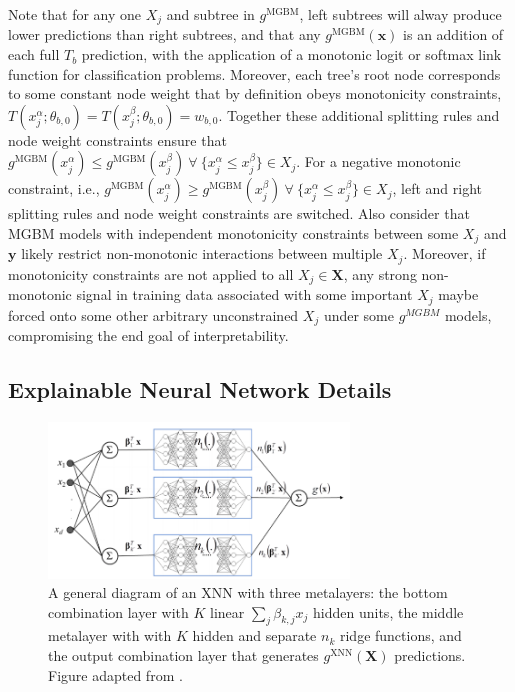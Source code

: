 \documentclass[information,article,submit,moreauthors,pdftex]{definitions/mdpi}
\begin{document}
\noindent Note that for any one $X_j$ and subtree in $g^{\text{MGBM}}$, left subtrees will alway produce lower predictions than right subtrees, and that any $g^{\text{MGBM}}(\mathbf{x})$ is an addition of each full $T_b$ prediction, with the application of a monotonic logit or softmax link function for classification problems. Moreover, each tree's root node corresponds to some constant node weight that by definition obeys monotonicity constraints, $ T(x^{\alpha}_j; \theta_{b,0}) = T(x^{\beta}_j; \theta_{b,0}) = w_{b,0}$. Together these additional splitting rules and node weight constraints ensure that $g^{\text{MGBM}}(x^{\alpha}_j) \le g^{\text{MGBM}}(x^{\beta}_j) ~\forall~ \{x^{\alpha}_j \le x^{\beta}_j\} \in X_j$. For a negative monotonic constraint, i.e., $g^{\text{MGBM}}(x^{\alpha}_j)  \ge g^{\text{MGBM}}(x^{\beta}_j) ~\forall~ \{x^{\alpha}_j \le x^{\beta}_j\} \in X_j$, left and right splitting rules and node weight constraints are switched. Also consider that MGBM models with independent monotonicity constraints between some $X_j$ and $\mathbf{y}$ likely restrict non-monotonic interactions between multiple $X_j$. Moreover, if monotonicity constraints are not applied to all $X_j \in \mathbf{X}$, any strong non-monotonic signal in training data associated with some important $X_j$ maybe forced onto some other arbitrary unconstrained $X_j$ under some $g^{MGBM}$ models, compromising the end goal of interpretability.

\subsection{Explainable Neural Network Details}\label{a_ssec:xnn}

\begin{figure}[H]
	\centering
	\includegraphics[width=8cm]{img/xnn_arch.png}
	\caption{A general diagram of an XNN with three metalayers: the bottom combination layer with  $K$ linear $\sum_j\beta_{k,j}x_j$ hidden units, the middle metalayer with with $K$ hidden and separate $n_k$ ridge functions, and the output combination layer that generates $g^{\text{XNN}}(\mathbf{X})$ predictions. Figure adapted from \citet{wf_xnn}.}
	\label{fig:xnn_arch}
\end{figure}  
\end{document}
